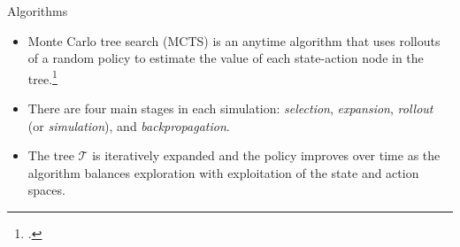 \begin{frame}{Algorithms}

\begin{itemize}
    \scriptsize
    \item Monte Carlo tree search (MCTS) is an anytime algorithm that uses rollouts of a random policy to estimate the value of each state-action node in the tree.\footcite{coulom2006efficient}
    \item There are four main stages in each simulation: \textit{selection}, \textit{expansion}, \textit{rollout} (or \textit{simulation}), and \textit{backpropagation}.
    \item The tree $\mathcal{T}$ is iteratively expanded and the policy improves over time as the algorithm balances exploration with exploitation of the state and action spaces.
\end{itemize}


\end{frame}

